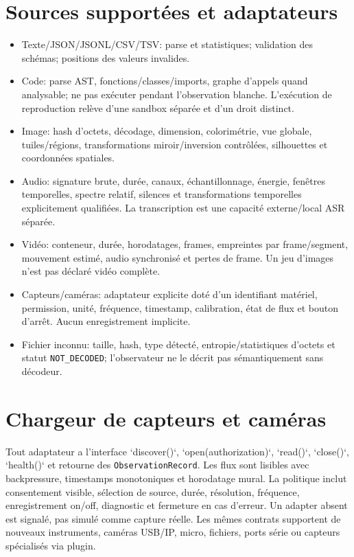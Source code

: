 \documentclass[11pt,a4paper,oneside]{report}
\begin{document}
\section{Sources supportées et adaptateurs}
\begin{itemize}
\item Texte/JSON/JSONL/CSV/TSV: parse et statistiques; validation des schémas; positions des valeurs invalides.
\item Code: parse AST, fonctions/classes/imports, graphe d'appels quand analysable; ne pas exécuter pendant l'observation blanche. L'exécution de reproduction relève d'une sandbox séparée et d'un droit distinct.
\item Image: hash d'octets, décodage, dimension, colorimétrie, vue globale, tuiles/régions, transformations miroir/inversion contrôlées, silhouettes et coordonnées spatiales.
\item Audio: signature brute, durée, canaux, échantillonnage, énergie, fenêtres temporelles, spectre relatif, silences et transformations temporelles explicitement qualifiées. La transcription est une capacité externe/local ASR séparée.
\item Vidéo: conteneur, durée, horodatages, frames, empreintes par frame/segment, mouvement estimé, audio synchronisé et pertes de frame. Un jeu d'images n'est pas déclaré vidéo complète.
\item Capteurs/caméras: adaptateur explicite doté d'un identifiant matériel, permission, unité, fréquence, timestamp, calibration, état de flux et bouton d'arrêt. Aucun enregistrement implicite.
\item Fichier inconnu: taille, hash, type détecté, entropie/statistiques d'octets et statut \texttt{NOT\_DECODED}; l'observateur ne le décrit pas sémantiquement sans décodeur.
\end{itemize}

\section{Chargeur de capteurs et caméras}
Tout adaptateur a l'interface `discover()`, `open(authorization)`, `read()`, `close()`, `health()` et retourne des \texttt{ObservationRecord}. Les flux sont lisibles avec backpressure, timestamps monotoniques et horodatage mural. La politique inclut consentement visible, sélection de source, durée, résolution, fréquence, enregistrement on/off, diagnostic et fermeture en cas d'erreur. Un adapter absent est signalé, pas simulé comme capture réelle. Les mêmes contrats supportent de nouveaux instruments, caméras USB/IP, micro, fichiers, ports série ou capteurs spécialisés via plugin.
\end{document}
